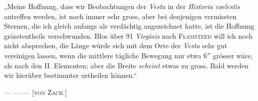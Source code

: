 \par\indent „Meine Hoffnung, dass wir Beobachtungen der \emph{Vesta} in der \emph{Historia coelestis} antreffen werden, ist noch immer sehr gross, aber bei denjenigen vermissten Sternen, die ich gleich anfangs als verdächtig angezeichnet hatte, ist die Hoffnung grösstentheils verschwunden. Blos über 91 \emph{Virginis} nach
%
\textsc{Flamsteed} will ich noch nicht absprechen, die Länge würde sich mit dem Orte der \emph{Vesta} sehr gut vereinigen lassen, wenn die mittlere tägliche Bewegung nur etwa $6''$ grösser wäre, als nach den II. Elementen; aber die Breite \emph{scheint} etwas zu gross. Bald werden wir hierüber bestimmter urtheilen können.“

--- --- ---
\hfill [\textsc{von Zach}.]

